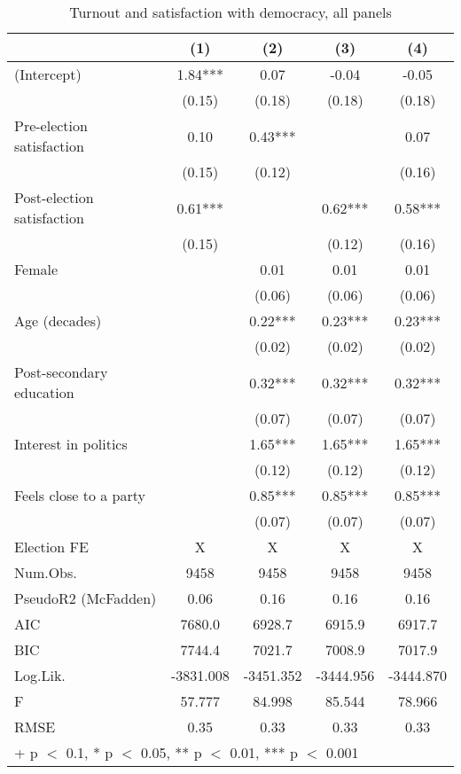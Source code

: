 \begin{table}

\caption{Turnout and satisfaction with democracy, all panels}
\centering
\begin{tabular}[t]{lcccc}
\toprule
  & (1) & (2) & (3) & (4)\\
\midrule
(Intercept) & 1.84*** & 0.07 & -0.04 & -0.05\\
 & (0.15) & (0.18) & (0.18) & (0.18)\\
Pre-election satisfaction & 0.10 & 0.43*** &  & 0.07\\
 & (0.15) & (0.12) &  & (0.16)\\
Post-election satisfaction & 0.61*** &  & 0.62*** & 0.58***\\
 & (0.15) &  & (0.12) & (0.16)\\
Female &  & 0.01 & 0.01 & 0.01\\
 &  & (0.06) & (0.06) & (0.06)\\
Age (decades) &  & 0.22*** & 0.23*** & 0.23***\\
 &  & (0.02) & (0.02) & (0.02)\\
Post-secondary education &  & 0.32*** & 0.32*** & 0.32***\\
 &  & (0.07) & (0.07) & \vphantom{1} (0.07)\\
Interest in politics &  & 1.65*** & 1.65*** & 1.65***\\
 &  & (0.12) & (0.12) & (0.12)\\
Feels close to a party &  & 0.85*** & 0.85*** & 0.85***\\
 &  & (0.07) & (0.07) & (0.07)\\
\midrule
Election FE & X & X & X & X\\
Num.Obs. & 9458 & 9458 & 9458 & 9458\\
PseudoR2 (McFadden) & 0.06 & 0.16 & 0.16 & 0.16\\
AIC & 7680.0 & 6928.7 & 6915.9 & 6917.7\\
BIC & 7744.4 & 7021.7 & 7008.9 & 7017.9\\
Log.Lik. & -3831.008 & -3451.352 & -3444.956 & -3444.870\\
F & 57.777 & 84.998 & 85.544 & 78.966\\
RMSE & 0.35 & 0.33 & 0.33 & 0.33\\
\bottomrule
\multicolumn{5}{l}{\rule{0pt}{1em}+ p $<$ 0.1, * p $<$ 0.05, ** p $<$ 0.01, *** p $<$ 0.001}\\
\end{tabular}
\end{table}
